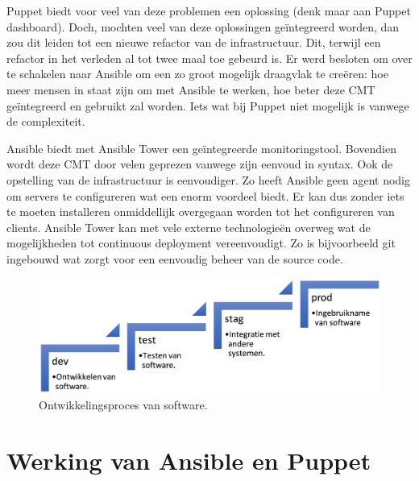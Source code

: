 Puppet biedt voor veel van deze problemen een oplossing (denk maar aan Puppet dashboard). Doch, mochten veel van deze oplossingen ge\"integreerd worden, dan zou dit leiden tot een  nieuwe refactor van de infrastructuur. Dit, terwijl een refactor in het verleden al tot twee maal toe gebeurd is. Er werd besloten om over te schakelen naar Ansible om een zo groot mogelijk draagvlak te cre\"eren: hoe meer mensen in staat zijn om met Ansible te werken, hoe beter deze \gls{CMT} ge\"integreerd en gebruikt zal worden. Iets wat bij Puppet niet mogelijk is vanwege de complexiteit.

Ansible biedt met Ansible Tower een ge\"integreerde monitoringstool. Bovendien wordt deze \gls{CMT} door velen geprezen vanwege zijn eenvoud in syntax. Ook de opstelling van de infrastructuur is eenvoudiger. Zo heeft Ansible geen agent nodig om servers te configureren wat een enorm voordeel biedt. Er kan dus zonder iets te moeten installeren onmiddellijk overgegaan worden tot het configureren van clients. Ansible Tower kan met vele externe technologie\"en overweg wat de mogelijkheden tot continuous deployment vereenvoudigt. Zo is bijvoorbeeld git ingebouwd wat zorgt voor een eenvoudig beheer van de source code.

\begin{figure}
	\includegraphics[width=\linewidth]{img/multistage.png} 
	\caption{Ontwikkelingsproces van software.}  
	  \label{fig:multistage}
\end{figure}




\section{Werking van Ansible en Puppet}
\label{sec:methodologie-technische-verschillen}

